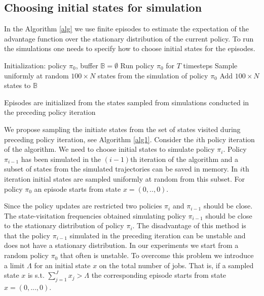 \documentclass[11pt]{article}
\theoremstyle{definition}
\numberwithin{equation}{section}
\begin{document}
\subsection{Choosing initial states for simulation}

In the Algorithm \ref{alg} we use finite episodes to estimate the expectation of the advantage function over the stationary distribution of the current policy. To run the simulations one needs to specify how to choose initial states for the episodes.

\begin{algorithm}[h]
\SetAlgoLined
{}
 Initialization: policy $\pi_{0}$,  buffer $\mathbb{B}=\emptyset$\;
 Run policy $\pi_{0}$ for $T$ timesteps\;
 Sample uniformly at random $100\times N$ states from the simulation of policy $\pi_{0}$\;
 Add $100\times N$ states to $\mathbb{B}$\;

 \caption{Episodes are initialized from the states sampled from simulations conducted in the preceding policy iteration}\label{alg1}
\end{algorithm}


 We propose sampling the initiate states from the set of states visited during preceding policy iteration, see Algorithm \ref{alg1}.
  Consider the $i$th policy iteration of the algorithm. We need to choose initial states to simulate policy $\pi_i$.  Policy $\pi_{i-1}$ has been simulated in the $(i-1)$th iteration of the algorithm and a subset of states from the simulated trajectories can be saved in memory. In $i$th iteration initial states are sampled uniformly at random from this subset. For policy $\pi_0$ an episode starts from state $x = (0,..,0).$

  Since the policy updates are restricted  two policies $\pi_i$ and $\pi_{i-1}$ should be close.  The state-visitation frequencies  obtained simulating policy $\pi_{i-1}$  should be close to the stationary distribution of policy $\pi_i.$ The disadvantage of this method is that the policy $\pi_{i-1}$ simulated in the preceding iteration can be unstable and does not have a stationary distribution. In our experiments we start from a random policy $\pi_0$ that often is unstable.  To overcome this problem we introduce a limit $\Lambda$ for an initial state $x$ on the total number of  jobs. That is, if a sampled state $x$ is s.t. $\sum\limits_{j=1}^J x_j >\Lambda$ the corresponding episode starts from state $x = (0,...,0).$
\end{document}
